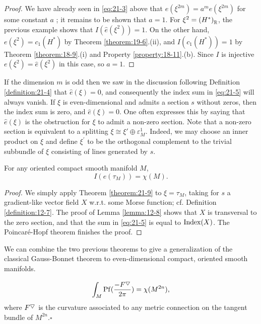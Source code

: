 \begin{proof}
  We have already seen in \eqref{eq:21-3} above that $\hat{e}( {\xi }^{2m})  = {a}^{m}e( {\xi }^{2m})$ for 
  some constant $a$ ; it remains to be shown that $a = 1$. For ${\xi }^{2} = {( {H}^*) }_{\mathbb{R}}$, the 
  previous example shows that $I(\hat{e}(\xi^2)) = 1$. On the other hand, $e(\xi^2) = c_1(H^*)$ 
  by Theorem \ref{theorem:19-6}.(ii), and $I( {{c}_{1}( {H}^*) }) = 1$ by Theorem \ref{theorem:18-9}.(i) and 
  Property \ref{property:18-11}.(b). Since $I$ is injective $e( {\xi }^{2})  = \hat{e}( {\xi }^{2})$ in this 
  case, so $a = 1$.
\end{proof}


If the dimension $m$ is odd then we saw in the discussion following Definition \ref{definition:21-4} 
that $\hat{e}( \xi ) = 0$, and consequently the index sum in \eqref{eq:21-5} will always vanish. If $\xi$ is 
even-dimensional and admits a section $s$ without zeros, then the index sum is zero, and $\hat{e}(\xi) = 0$. 
One often expresses this by saying that $\hat{e}( \xi )$ is the obstruction for $\xi$ to admit a non-zero 
section. Note that a non-zero section is equivalent to a splitting $\xi\cong \xi'\oplus\varepsilon_{M}^{1}$. 
Indeed, we may choose an inner product on $\xi$ and define ${\xi }^{\prime }$ to be the orthogonal complement 
to the trivial subbundle of $\xi$ consisting of lines generated by $s$.

\begin{theorem}\label{theorem:21-12}
  For any oriented compact smooth manifold $M$,  
  \[
    I(e( {\tau }_{M})) = \chi(M).
  \]
\end{theorem}

\begin{proof}
  We simply apply Theorem \ref{theorem:21-9} to $\xi  = {\tau }_{M}$, taking for $s$ a gradient-like vector 
  field $X$ w.r.t. some Morse function; cf. Definition \ref{definition:12-7}. The proof of Lemma \ref{lemma:12-8} shows 
  that $X$ is transversal to the zero section, and that the sum in \eqref{eq:21-5} is equal to $\mathrm{Index}( X)$. The 
  Poincar\'e-Hopf theorem finishes the proof.
\end{proof}

We can combine the two previous theorems to give a generalization of the classical Gauss-Bonnet theorem 
to even-dimensional compact, oriented smooth manifolds.

\begin{theorem}\label{theorem:21-13}
  \[
    \int_M\mathrm{Pf}( \frac{-F^\bigtriangledown}{2\pi })  = \chi ( {M}^{2n}),
  \]
  where ${F}^{\bigtriangledown }$ is the curvature associated to any metric connection on the tangent 
  bundle of ${M}^{2n}$.\hfill$\square$
\end{theorem}

